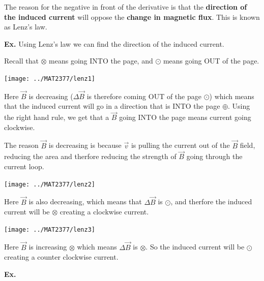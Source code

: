 \documentclass[12pt,letterpaper]{article} \usepackage{amsmath} \usepackage{graphicx} \usepackage[margin=1in]{geometry} \usepackage{longtable}  \usepackage{amssymb}
\begin{document}
	The reason for the negative in front of the derivative is that the \textbf{direction of the induced current} will oppose the \textbf{change in magnetic flux}. This is known as Lenz's law.
	
	\begin{mdframed}
		\textbf{Ex. } Using Lenz's law we can find the direction of the induced current.
		
		Recall that $\otimes$ means going INTO the page, and $\odot$ means going OUT of the page.
		
		\begin{center}
			\texttt{[image: ../MAT2377/lenz1]}
		\end{center}
		Here $\vec B$ is decreasing ($\Delta \vec B$ is therefore coming OUT of the page $\odot$) which means that the induced current will go in a direction that is INTO the page $\oplus$. Using the right hand rule, we get that a $\vec B$ going INTO the page means current going clockwise.
		
		The reason $\vec B$ is decreasing is because $\vec v$ is pulling the current out of the $\vec B$ field, reducing the area and therfore reducing the strength of $\vec B$ going through the current loop.
		
		\begin{center}
			\texttt{[image: ../MAT2377/lenz2]}
		\end{center}
		Here $\vec B$ is also decreasing, which means that $\Delta \vec B$ is $\odot$, and therfore the induced current will be $\otimes$ creating a clockwise current.
		
		\begin{center}
			\texttt{[image: ../MAT2377/lenz3]}
		\end{center}
		Here $\vec B$ is increasing $\otimes$ which means $\Delta \vec B$ is $\otimes$. So the induced current will be $\odot$ creating a counter clockwise current.
		
	\end{mdframed}

	\begin{mdframed}
		\textbf{Ex. }
	\end{mdframed}
	
	
\end{document}
